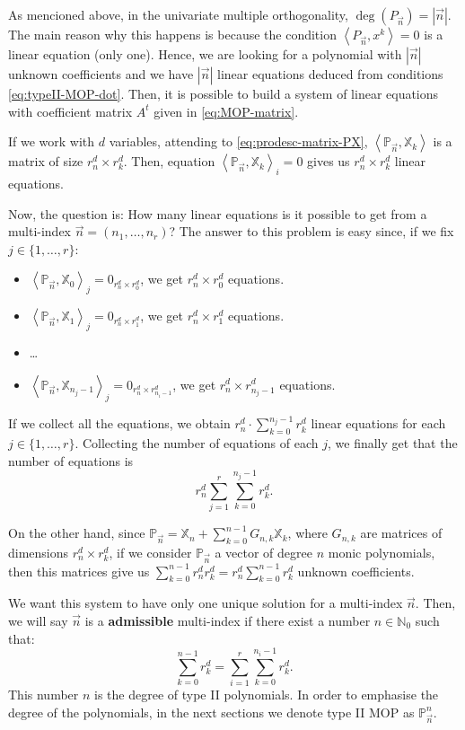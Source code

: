 \documentclass[12pt,a4]{article}
\theoremstyle{plain}
\newcommand{\N}[0]{\mathbb{N}}
\newcommand{\prodesc}[2]{\left\langle #1 , #2 \right\rangle}
\begin{document}
As mencioned above, in the univariate multiple orthogonality, $\deg(P_{\vec n})=|\vec n|$. The main reason why this happens is because the condition $\prodesc{P_{\vec n}}{x^k}=0$ is a linear equation (only one). Hence, we are looking for a polynomial with $|\vec n|$ unknown coefficients and we have $|\vec n|$ linear equations deduced from conditions \eqref{eq:typeII-MOP-dot}. Then, it is possible to build a system of linear equations with coefficient matrix $A^t$ given in \eqref{eq:MOP-matrix}.

If we work with $d$ variables, attending to \eqref{eq:prodesc-matrix-PX}, $\prodesc{\mathbb P_{\vec n}}{\mathbb X_k}$ is a matrix of size $r_n^d\times r_k^d$. Then, equation $\prodesc{\mathbb P_{\vec n}}{\mathbb X_k}_i = 0$ gives us $r_n^d\times r_k^d$ linear equations.

Now, the question is: How many linear equations is it possible to get from a multi-index $\vec n =(n_1, \dots, n_r)$? The answer to this problem is easy since, if we fix $j\in\{1,\dots,r\}$:
\begin{itemize}
    \item $\prodesc{\mathbb P_{\vec n}}{\mathbb X_0}_j = 0_{r^d_n\times r^d_0}$, we get $r^d_n\times r^d_0$ equations.
    \item $\prodesc{\mathbb P_{\vec n}}{\mathbb X_1}_j = 0_{r^d_n\times r^d_1}$, we get $r^d_n\times r^d_1$ equations.
    \item \dots
    \item $\prodesc{\mathbb P_{\vec n}}{\mathbb X_{n_j-1}}_j = 0_{r^d_n\times r^d_{n_i-1}}$, we get $r^d_n\times r^d_{n_j-1}$ equations.
\end{itemize} 
If we collect all the equations, we obtain $r_n^d\cdot\displaystyle\sum_{k=0}^{n_j-1}r^d_k$ linear equations for each $j\in\{1,\dots,r\}$. Collecting the number of equations of each $j$, we finally get that the number of equations is 
\begin{equation}
    \label{eq:number-eqs}
    r_n^d \sum_{j=1}^r \sum_{k=0}^{n_j-1} r_k^d.
\end{equation}

On the other hand, since $\mathbb P_{\vec n} = \mathbb X_n + \displaystyle\sum_{k=0}^{n-1}G_{n,k} \mathbb X_k$, where $G_{n,k}$ are matrices of dimensions $r^d_n\times r^d_k$, if we consider $\mathbb P_{\vec n}$ a vector of degree $n$ monic polynomials, then this matrices give us $\displaystyle\sum_{k=0}^{n-1}r^d_n r^d_k=r^d_n\displaystyle\sum_{k=0}^{n-1} r^d_k$ unknown coefficients.

We want this system to have only one unique solution for a multi-index $\vec n$. Then, we will say $\vec n$ is a \textbf{admissible} multi-index if there exist a number $n\in\N_0$ such that:
\begin{equation}
    \label{eq:condition-type-ii-general}
    \displaystyle\sum_{k=0}^{n-1} r^d_k = \sum_{i=1}^r \sum_{k=0}^{n_i-1} r_k^d.
\end{equation}
This number $n$ is the degree of type II polynomials. In order to emphasise the degree of the polynomials, in the next sections we denote type II MOP as $\mathbb P_{\vec n}^n$.
\end{document}
